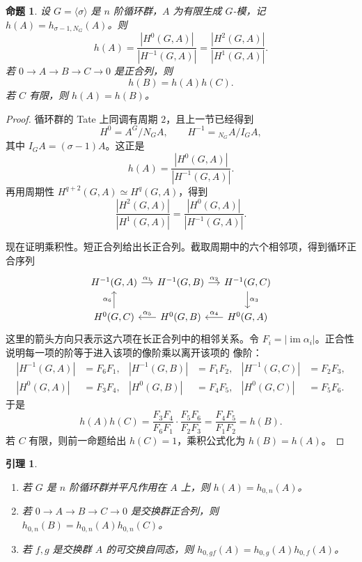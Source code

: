\documentclass[11pt,a4paper,openany]{ctexbook}
\numberwithin{equation}{chapter}
\theoremstyle{plain}
\newtheorem{proposition}[theorem]{命题}
\newtheorem{lemma}[theorem]{引理}
\theoremstyle{definition}
\theoremstyle{remark}
\begin{document}
\begin{proposition}
设 $G=\langle\sigma\rangle$ 是 $n$ 阶循环群，$A$ 为有限生成 $G$-模，记 $h(A)=h_{\sigma-1,N_G}(A)$。则
\[
 h(A)=\frac{|H^0(G,A)|}{|H^{-1}(G,A)|}
 =\frac{|H^2(G,A)|}{|H^1(G,A)|}.
\]
若 $0\to A\to B\to C\to0$ 是正合列，则
\[
 h(B)=h(A)h(C).
\]
若 $C$ 有限，则 $h(A)=h(B)$。
\end{proposition}

\begin{proof}
循环群的 Tate 上同调有周期 $2$，且上一节已经得到
\[
 H^0=A^G/N_GA,\qquad H^{-1}={}_{N_G}A/I_GA,
\]
其中 $I_GA=(\sigma-1)A$。这正是
\[
h(A)=\frac{|H^0(G,A)|}{|H^{-1}(G,A)|}.
\]
再用周期性 $H^{q+2}(G,A)\simeq H^q(G,A)$，得到
\[
\frac{|H^2(G,A)|}{|H^1(G,A)|}
=\frac{|H^0(G,A)|}{|H^{-1}(G,A)|}.
\]

现在证明乘积性。短正合列给出长正合列。截取周期中的六个相邻项，得到循环正合序列
\[
\begin{tikzcd}[column sep=small]
H^{-1}(G,A)\arrow[r,"\alpha_1"]&
H^{-1}(G,B)\arrow[r,"\alpha_2"]&
H^{-1}(G,C)\arrow[d,"\alpha_3"]\\
H^{0}(G,C)\arrow[u,"\alpha_6"]&
H^{0}(G,B)\arrow[l,"\alpha_5"']&
H^{0}(G,A)\arrow[l,"\alpha_4"']
\end{tikzcd}
\]
这里的箭头方向只表示这六项在长正合列中的相邻关系。令
$F_i=|\operatorname{im}\alpha_i|$。正合性说明每一项的阶等于进入该项的像阶乘以离开该项的
像阶：
\[
\begin{aligned}
|H^{-1}(G,A)|&=F_6F_1,&
|H^{-1}(G,B)|&=F_1F_2,&
|H^{-1}(G,C)|&=F_2F_3,\\
|H^0(G,A)|&=F_3F_4,&
|H^0(G,B)|&=F_4F_5,&
|H^0(G,C)|&=F_5F_6.
\end{aligned}
\]
于是
\[
h(A)h(C)
=\frac{F_3F_4}{F_6F_1}\cdot
\frac{F_5F_6}{F_2F_3}
=\frac{F_4F_5}{F_1F_2}
=h(B).
\]
若 $C$ 有限，则前一命题给出 $h(C)=1$，乘积公式化为 $h(B)=h(A)$。
\end{proof}

\begin{lemma}
\begin{enumerate}[label=(\arabic*)]
\item 若 $G$ 是 $n$ 阶循环群并平凡作用在 $A$ 上，则 $h(A)=h_{0,n}(A)$。
\item 若 $0\to A\to B\to C\to0$ 是交换群正合列，则 $h_{0,n}(B)=h_{0,n}(A)h_{0,n}(C)$。
\item 若 $f,g$ 是交换群 $A$ 的可交换自同态，则 $h_{0,gf}(A)=h_{0,g}(A)h_{0,f}(A)$。
\end{enumerate}
\end{lemma}
\end{document}
